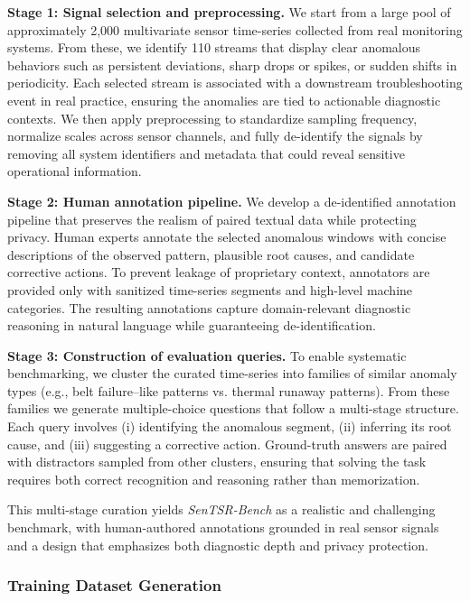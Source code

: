 \documentclass[twoside]{article}
\begin{document}
\textbf{Stage 1: Signal selection and preprocessing.}  
We start from a large pool of approximately 2,000 multivariate sensor time-series collected from real monitoring systems. From these, we identify 110 streams that display clear anomalous behaviors such as persistent deviations, sharp drops or spikes, or sudden shifts in periodicity. Each selected stream is associated with a downstream troubleshooting event in real practice, ensuring the anomalies are tied to actionable diagnostic contexts. We then apply preprocessing to standardize sampling frequency, normalize scales across sensor channels, and fully de-identify the signals by removing all system identifiers and metadata that could reveal sensitive operational information.

\textbf{Stage 2: Human annotation pipeline.}  
We develop a de-identified annotation pipeline that preserves the realism of paired textual data while protecting privacy. Human experts annotate the selected anomalous windows with concise descriptions of the observed pattern, plausible root causes, and candidate corrective actions. To prevent leakage of proprietary context, annotators are provided only with sanitized time-series segments and high-level machine categories. The resulting annotations capture domain-relevant diagnostic reasoning in natural language while guaranteeing de-identification.

\textbf{Stage 3: Construction of evaluation queries.}  
To enable systematic benchmarking, we cluster the curated time-series into families of similar anomaly types (e.g., belt failure–like patterns vs. thermal runaway patterns). From these families we generate multiple-choice questions that follow a multi-stage structure. Each query involves (i) identifying the anomalous segment, (ii) inferring its root cause, and (iii) suggesting a corrective action. Ground-truth answers are paired with distractors sampled from other clusters, ensuring that solving the task requires both correct recognition and reasoning rather than memorization. 

This multi-stage curation yields \textit{SenTSR-Bench} as a realistic and challenging benchmark, with human-authored annotations grounded in real sensor signals and a design that emphasizes both diagnostic depth and privacy protection.

\subsubsection{Training Dataset Generation}
\label{app:train-data}
\end{document}
